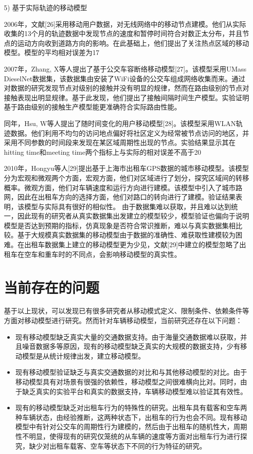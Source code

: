 5) 基于实际轨迹的移动模型

2006年，文献[26]采用移动用户数据，对无线网络中的移动节点建模。他们从实际收集的13个月的轨迹数据中发现节点的速度和暂停时间符合对数正太分布，并且节点的运动方向收到道路方向的影响。在此基础上，他们提出了关注热点区域的移动模型。模型的平均相对误差为17%

2007年，Zhang, X等人提出了基于公交车容断络移动模型[27]。该模型采用UMass DieselNet数据集，该数据集由安装了WiFi设备的公交车组成网络收集而来。通过对数据的研究发现节点对级别的接触并没有明显的规律，然而在路由级别的节点对接触表现出明显规律。基于此发现，他们提出了接触间隔时间生产模型。实验证明基于路由级别的接触生产模型能更准确符合实际路由性能。

同年，Hsu, W等人提出了随时间变化的用户移动模型[28]。该模型采用WLAN轨迹数据。他们利用不均匀的访问地点偏好将社区定义为经常被节点访问的地区，并采用不同参数的时间段来发现在某区域周期性出现的节点。实验结果显示其在hitting time和meeting time两个指标上与实际的相对误差不高于20%

2010年，Hongyu等人[29]提出基于上海市出租车GPS数据的城市移动模型。该模型分为宏观和微观两个方面，宏观方面，他们对区域进行了划分，探究区域间的转移概率。微观方面，他们对车辆速度和运行方向进行建模。该模型中引入了城市路网，因此在出租车方向的选择方面，他们对路口的转向进行了建模。验证结果表明，该模型与实际具有很好的相似性。
由于数据集难以获取，并且难以达到统一，因此现有的研究者从真实数据集出发建立的模型较少，模型验证也偏向于说明模型是否达到预期的指标，仿真现象是否符合常识推断，难以与真实数据集相比较。基于大规模真实数据集的移动模型由于数据的准确性、难获取性建模较为困难。在出租车数据集上建立的移动模型更为少见，文献[29]中建立的模型忽略了出租车在空车和重车时的不同点，会影响移动模型的真实性。

\section{当前存在的问题}

基于以上现状，可以发现已有很多研究者从移动模式定义、限制条件、依赖条件等方面对移动模型进行研究。然而针对车辆移动模型，当前研究还存在以下问题：
\begin{itemize}
  \item 
现有移动模型缺乏真实大量的交通数据支持。由于海量交通数据难以获取，并且噪音数据多等原因，现有的移动模型缺乏真实的大规模的数据支持，少有移动模型是从统计规律出发，建立移动模型。
\item 现有移动模型验证缺乏与真实交通数据的对比和与其他移动模型的对比。由于移动模型具有对场景有很强的依赖性，移动模型之间很难横向比对。同时，由于缺乏真实的实验平台和真实的数据支持，车辆移动模型难以验证其有效性。
\item
现有的移动模型缺乏对出租车行为的特殊性的研究。出租车具有载客和空车两种车辆状态，由经验推断，这两种状态下，出租车的行为也会不同。现有移动模型中有针对公交车的周期性行为建模的，然后由于出租车的随机性大，周期性不明显，使得现有的研究仅笼统的从车辆的速度等方面对出租车行为进行探究，缺少对出租车载客、空车等状态下不同的行为特征的研究。
\end{itemize}

